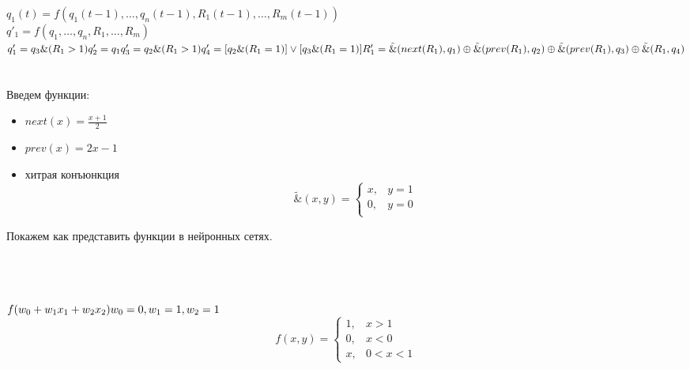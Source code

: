 \documentclass[a4paper]{article}
\begin{document}
{\large $q_1(t)=f(q_1(t-1),\dots,q_{n}(t-1),R_1(t-1),\dots,R_m(t-1))$\\ $q'_1=f(q_1,\dots,q_n,R_1,\dots,R_m)$\\ $q'_1=q_3\&(R_1>1)\\ q'_2=q_1\\q'_3=q_2\&(R_1>1)\\q'_4=[q_2\&(R_1=1)]\vee[q_3\&(R_1=1)]\\\\R'_1=\tilde{\&}(next(R_1),q_1)\oplus \tilde{\&}(prev(R_1),q_2)\oplus \tilde{\&}(prev(R_1),q_3)\oplus \tilde{\&}(R_1,q_4)$\\\\}
\\
{\large Введем функции:}
{\large
\begin{itemize}
  \item $next(x)=\frac{x+1}{2}$
  \item $prev(x)=2x-1$
  \item хитрая конъюнкция 
  \begin{equation*}
\tilde{\&}(x,y) = 
 \begin{cases}
   x, &\text{$y=1$}\\
   0, &\text{$y=0$}\\
 \end{cases}
\end{equation*}
\end{itemize}}
{\large Покажем как представить функции в нейронных сетях.\\\\}
\\\\
{\large $f(w_0+w_1x_1+w_2x_2)\\ w_0=0,w_1=1,w_2=1$\\}
\begin{equation*}
f(x,y) = 
 \begin{cases}
   1, &\text{$x>1$}\\
   0, &\text{$x<0$}\\
   x, &\text{$0<x<1$}
 \end{cases}
\end{equation*}
\end{document}
